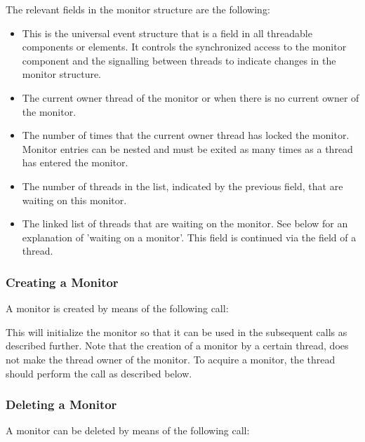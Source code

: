 The relevant fields in the monitor structure are the following:

\begin{itemize}
\item {} This is the universal event structure that is a field
in all threadable components or elements. It controls the synchronized access
to the monitor component and the signalling between threads to indicate changes
in the monitor structure.
\item {} The current owner thread of the monitor
or  when there is no current owner of the monitor.
\item {} The number of times that the
current owner thread has locked the monitor. Monitor entries can be nested
and must be exited as many times as a thread has entered the monitor.
\item {} The number of threads in
the list, indicated by the previous field, that are waiting on this monitor.
\item {} The linked list of threads
that are waiting on the monitor. See below for an explanation of 'waiting on
a monitor'. This field is continued via the
 field of a thread.
\end{itemize}

\subsubsection{Creating a Monitor}

A monitor is created by means of the following call:


This will initialize the monitor so that it can be used in the subsequent
calls as described further. Note that the creation of a monitor by a certain
thread, does not make the thread owner of the monitor. To acquire a monitor,
the thread should perform the  call as described
below.

\subsubsection{Deleting a Monitor}

A monitor can be deleted by means of the following call:

